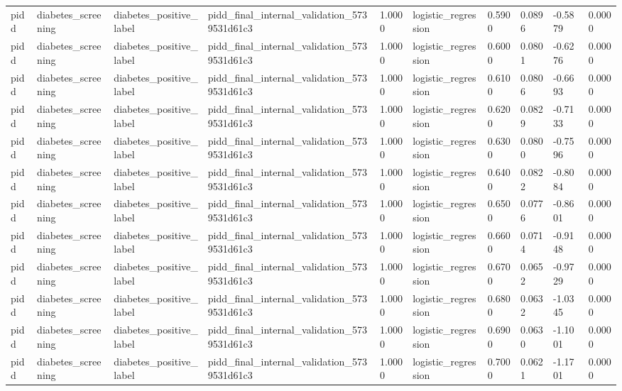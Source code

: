 \begin{tabular}{llllllllll}
pidd & diabetes\_screening & diabetes\_positive\_label & pidd\_final\_internal\_validation\_5739531d61c3 & 1.0000 & logistic\_regression & 0.5900 & 0.0896 & -0.5879 & 0.0000 \\
pidd & diabetes\_screening & diabetes\_positive\_label & pidd\_final\_internal\_validation\_5739531d61c3 & 1.0000 & logistic\_regression & 0.6000 & 0.0801 & -0.6276 & 0.0000 \\
pidd & diabetes\_screening & diabetes\_positive\_label & pidd\_final\_internal\_validation\_5739531d61c3 & 1.0000 & logistic\_regression & 0.6100 & 0.0806 & -0.6693 & 0.0000 \\
pidd & diabetes\_screening & diabetes\_positive\_label & pidd\_final\_internal\_validation\_5739531d61c3 & 1.0000 & logistic\_regression & 0.6200 & 0.0829 & -0.7133 & 0.0000 \\
pidd & diabetes\_screening & diabetes\_positive\_label & pidd\_final\_internal\_validation\_5739531d61c3 & 1.0000 & logistic\_regression & 0.6300 & 0.0800 & -0.7596 & 0.0000 \\
pidd & diabetes\_screening & diabetes\_positive\_label & pidd\_final\_internal\_validation\_5739531d61c3 & 1.0000 & logistic\_regression & 0.6400 & 0.0822 & -0.8084 & 0.0000 \\
pidd & diabetes\_screening & diabetes\_positive\_label & pidd\_final\_internal\_validation\_5739531d61c3 & 1.0000 & logistic\_regression & 0.6500 & 0.0776 & -0.8601 & 0.0000 \\
pidd & diabetes\_screening & diabetes\_positive\_label & pidd\_final\_internal\_validation\_5739531d61c3 & 1.0000 & logistic\_regression & 0.6600 & 0.0714 & -0.9148 & 0.0000 \\
pidd & diabetes\_screening & diabetes\_positive\_label & pidd\_final\_internal\_validation\_5739531d61c3 & 1.0000 & logistic\_regression & 0.6700 & 0.0652 & -0.9729 & 0.0000 \\
pidd & diabetes\_screening & diabetes\_positive\_label & pidd\_final\_internal\_validation\_5739531d61c3 & 1.0000 & logistic\_regression & 0.6800 & 0.0632 & -1.0345 & 0.0000 \\
pidd & diabetes\_screening & diabetes\_positive\_label & pidd\_final\_internal\_validation\_5739531d61c3 & 1.0000 & logistic\_regression & 0.6900 & 0.0630 & -1.1001 & 0.0000 \\
pidd & diabetes\_screening & diabetes\_positive\_label & pidd\_final\_internal\_validation\_5739531d61c3 & 1.0000 & logistic\_regression & 0.7000 & 0.0621 & -1.1701 & 0.0000 \\

\end{tabular}
